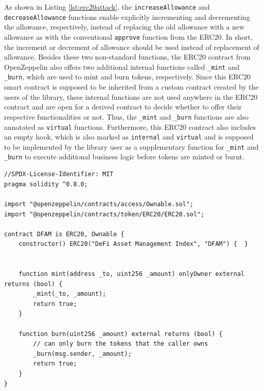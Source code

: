 As shown in Listing \ref{lst:erc20attack}, the \texttt{increaseAllowance} and \texttt{decreaseAllowance} functions enable explicitly incrementing and decrementing the allowance, respectively, instead of replacing the old allowance with a new allowance as with the conventional \texttt{approve} function from the ERC20. In short, the increment or decrement of allowance should be used instead of replacement of allowance. Besides these two non-standard functions, the ERC20 contract from OpenZeppelin also offers two additional internal functions called \texttt{\_mint} and \texttt{\_burn}, which are used to mint and burn tokens, respectively. Since this ERC20 smart contract is supposed to be inherited from a custom contract created by the users of the library, these internal functions are not used anywhere in the ERC20 contract and are open for a derived contract to decide whether to offer their respective functionalities or not. Thus, the \texttt{\_mint} and \texttt{\_burn} functions  are also annotated as \texttt{virtual} functions. Furthermore, this ERC20 contract also includes an empty hook, which is also marked as \texttt{internal} and \texttt{virtual} and is supposed to be implemented by the library user as a supplementary function for \texttt{\_mint} and \texttt{\_burn} to execute additional business logic before tokens are minted or burnt.


\begin{lstlisting}[language=Solidity, label={lst:indextokencontract}, captionpos=b, caption={Solidity code of the \texttt{DFAM} smart contract\\}]
//SPDX-License-Identifier: MIT
pragma solidity ^0.8.0;

import "@openzeppelin/contracts/access/Ownable.sol";
import "@openzeppelin/contracts/token/ERC20/ERC20.sol";

contract DFAM is ERC20, Ownable {
    constructor() ERC20("DeFi Asset Management Index", "DFAM") {  }


    function mint(address _to, uint256 _amount) onlyOwner external returns (bool) {
        _mint(_to, _amount);
        return true;
    }

    function burn(uint256 _amount) external returns (bool) {
        // can only burn the tokens that the caller owns
        _burn(msg.sender, _amount);
        return true;
    }
}
\end{lstlisting}

